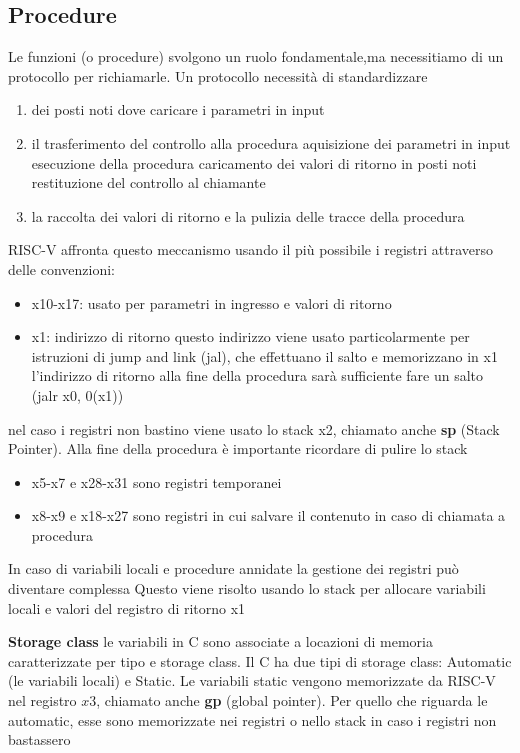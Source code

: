 \documentclass[12pt, a4paper]{article}
\begin{document}
\subsection{Procedure}
Le funzioni (o procedure) svolgono un ruolo fondamentale,ma necessitiamo di un protocollo
per richiamarle. Un protocollo necessità di standardizzare
\begin{enumerate}
  \item dei posti noti dove caricare i parametri in input
  \item il trasferimento del controllo alla procedura
  \subitem aquisizione dei parametri in input
  \subitem esecuzione della procedura
  \subitem caricamento dei valori di ritorno in posti noti
  \subitem restituzione del controllo al chiamante
  \item la raccolta dei valori di ritorno e la pulizia delle tracce della procedura
\end{enumerate}
RISC-V affronta questo meccanismo usando il più possibile i registri attraverso delle convenzioni:
\begin{itemize}
  \item x10-x17: usato per parametri in ingresso e valori di ritorno
  \item x1: indirizzo di ritorno
  \subitem questo indirizzo viene usato particolarmente per istruzioni di jump and link (jal), che effettuano il salto
  e memorizzano in x1 l'indirizzo di ritorno
  \subitem alla fine della procedura sarà sufficiente fare un salto (jalr x0, 0(x1))
\end{itemize}
nel caso i registri non bastino viene usato lo stack x2, chiamato anche \textbf{sp} (Stack Pointer). Alla fine della procedura è importante
ricordare di pulire lo stack

\begin{itemize}
  \item  x5-x7 e x28-x31 sono registri temporanei
  \item  x8-x9 e x18-x27 sono registri in cui salvare il contenuto in caso di chiamata a procedura
\end{itemize}

In caso di variabili locali e procedure annidate la gestione dei registri può diventare complessa
Questo viene risolto usando lo stack per allocare variabili locali e valori del registro di ritorno x1

\textbf{Storage class}
le variabili in C sono associate a locazioni di memoria caratterizzate per tipo e storage class. Il C ha due tipi
di storage class: Automatic (le variabili locali) e Static. Le variabili static vengono memorizzate da RISC-V
nel registro $x3$, chiamato anche \textbf{gp} (global pointer). Per quello che riguarda le automatic, esse sono memorizzate
nei registri o nello stack in caso i registri non bastassero
\end{document}
